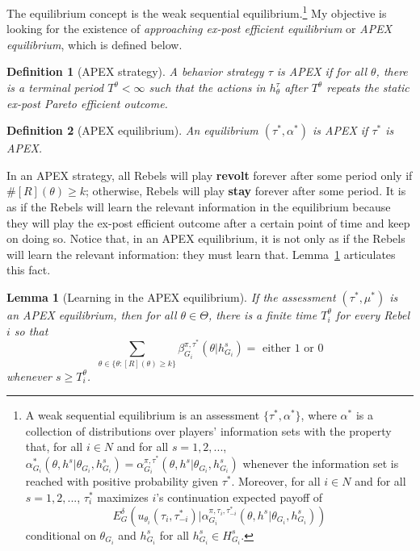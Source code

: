 \documentclass[12pt,letter]{article}
\newtheorem{lemma}{Lemma}[section]
\newtheorem{definition}{Definition}[section]
\theoremstyle{definition}
\theoremstyle{remark}
\theoremstyle{claim}
\begin{document}
The equilibrium concept is the weak sequential equilibrium.\footnote{A weak sequential equilibrium is an assessment $\{\tau^{*}, \alpha^{*}\}$, where $\alpha^{*}$ is a collection of distributions over players' information sets with the property that, for all $i\in N$ and for all $s=1,2,...$, $\alpha^{*}_{G_i}(\theta, h^{s}|\theta_{G_i},h^{s}_{G_i})=\alpha^{\pi,\tau^{*}}_{G_i}(\theta, h^{s}|\theta_{G_i},h^{s}_{G_i})$ whenever the information set is reached with positive probability given $\tau^{*}$. Moreover, for all $i\in N$ and for all $s=1,2,...$, $\tau^{*}_{i}$ maximizes $i$'s continuation expected payoff of
\[E^{\delta}_G(u_{\theta_i}(\tau_{i},\tau^{*}_{-i})|\alpha^{\pi,\tau_{i},\tau^{*}_{-i}}_{G_i}(\theta, h^{s}|\theta_{G_i},h^{s}_{G_i}))\] conditional on $\theta_{G_i}$ and $h^{s}_{G_i}$ for all $h^{s}_{G_i}\in H^s_{G_i}$.} 
My objective is looking for the existence of \textit{approaching ex-post efficient equilibrium} or \textit{APEX equilibrium}, which is defined below.

\begin{definition}[APEX strategy]
A behavior strategy $\tau$ is APEX  if for all $\theta$, there is a terminal period $T^{\theta}<\infty$ such that the actions in $h^{\tau}_{\theta}$ after $T^{\theta}$ repeats the static ex-post Pareto efficient outcome.
\end{definition}

\begin{definition}[APEX equilibrium]\label{Def_ex-post_efficient}
An equilibrium $(\tau^{*},\alpha^{*})$ is APEX if $\tau^{*}$ is APEX.
\end{definition}




In an APEX strategy, all Rebels will play \textbf{revolt} forever after some period only if $\#[R](\theta)\geq k$; otherwise, Rebels will play \textbf{stay} forever after some period. It is as if the Rebels will learn the relevant information in the equilibrium because they will play the ex-post efficient outcome after a certain point of time and keep on doing so. Notice that, in an APEX equilibrium, it is not only as if the Rebels will learn the relevant information: they must learn that. Lemma~\ref{lemma_learn} articulates this fact.

\begin{lemma}[Learning in the APEX equilibrium]\label{lemma_learn}
If the assessment $(\tau^*,\mu^{*})$ is an APEX equilibrium, then for all $\theta\in \Theta$, there is a finite time $T^{\theta}_i$ for every Rebel $i$ so that
\[\sum_{\theta\in\{\theta:[R](\theta)\geq k\}}\beta^{\pi,\tau^*}_{G_i}(\theta|h^{s}_{G_i})= \text{ either } 1 \text{ or } 0\]
whenever $s\geq T^{\theta}_i$.
\end{lemma}
\end{document}
